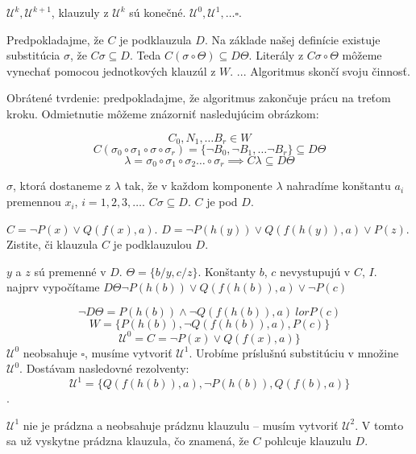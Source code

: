 \begin{poznamka}
    $\mathcal{U}^k, \mathcal{U}^{k+1}$, klauzuly z
    $\mathcal{U}^{k}$ sú konečné. $\mathcal{U}^0, \mathcal{U}^1, \ldots \square$.
\end{poznamka}

\begin{dokaz}
    Predpokladajme, že $C$ je podklauzula $D$. Na základe našej
    definície existuje substitúcia $\sigma$, že $C\sigma \subseteq D$. Teda
    $C(\sigma \circ \Theta) \subseteq D\Theta$. Literály z $C\sigma \circ \Theta$
    môžeme vynechať pomocou jednotkových klauzúl z $W$. ... Algoritmus skončí svoju
    činnosť.
    \par
    Obrátené tvrdenie: predpokladajme, že algoritmus zakončuje prácu na treťom
    kroku. Odmietnutie môžeme znázorniť nasledujúcim obrázkom:


    $$C_0, N_1 ,\ldots B_r \in W$$
    $$C(\sigma_0 \circ \sigma_1 \circ \sigma \circ \sigma_r) = \{ \neg B_0, \neg
    B_1, \ldots \neg B_r\} \subseteq D\Theta$$
    $$\lambda = \sigma_0 \circ \sigma_1 \circ \sigma_2 \ldots \circ \sigma_r \implies
    C \lambda \subseteq D\Theta$$

    $\sigma$, ktorá dostaneme z $\lambda$ tak, že v každom komponente $\lambda$
    nahradíme  konštantu $a_i$ premennou $x_i$, $i=1, 2, 3, \ldots$. $C\sigma
    \subseteq D$. $C$ je pod $D$.
\end{dokaz}

\begin{priklad}
    $C = \neg P(x) \lor Q(f(x), a)$. $D = \neg P(h(y)) \lor
    Q(f(h(y)),a) \lor P(z)$. Zistite, či klauzula $C$ je podklauzulou $D$.

    \par $y$ a $z$ sú premenné v $D$. $\Theta = \{ b/y, c/z\}$. Konštanty $b$, $c$
    nevystupujú v $C$, $I$. najprv vypočítame $D\Theta \neg P(h(b)) \lor
    Q(f(h(b)),a) \lor \neg P(c)$

    $$\neg D \Theta = P(h(b)) \land \neg Q(f(h(b)),a) \ lor P(c)$$
    $$W = \{P(h(b)), \neg Q(f(h(b)),a), P(c) \}$$
    $$\mathcal{U}^0 = C = \neg P(x) \lor Q(f(x),a)\}$$
    $\mathcal{U}^0$ neobsahuje $\square$, musíme vytvoriť $\mathcal{U}^1$. Urobíme
    príslušnú substitúciu v množine $\mathcal{U}^0$. Dostávam nasledovné rezolventy:
    $$\mathcal{U}^1 = \{ Q(f(h(b)),a), \neg P(h(b)), Q(f(b),a)\}$$. 
    \par
    $\mathcal{U}^1$
    nie je prádzna a neobsahuje prádznu klauzulu -- musím vytvoriť $\mathcal{U}^2$.
    V tomto sa už vyskytne prádzna klauzula, čo znamená, že $C$ pohlcuje klauzulu
    $D$.
\end{priklad}

